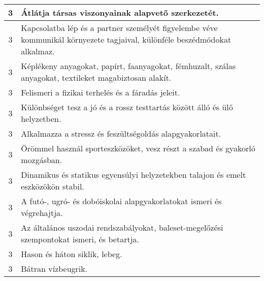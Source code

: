 \begin{longtable}{c | p{12cm} }
                                
                                          3 &  Átlátja társas viszonyainak alapvető szerkezetét. \\ \hline
                                          3 &  Kapcsolatba lép és a partner személyét figyelembe véve kommunikál környezete tagjaival, különféle beszédmódokat alkalmaz. \\ \hline
                                          3 &  Képlékeny anyagokat, papírt, faanyagokat, fémhuzalt, szálas anyagokat, textileket magabiztosan alakít. \\ \hline
                                          3 &  Felismeri a fizikai terhelés és a fáradás jeleit. \\ \hline
                                          3 &  Különbséget tesz a jó és a rossz testtartás között álló és ülő helyzetben. \\ \hline
                                          3 &  Alkalmazza a stressz és feszültségoldás alapgyakorlatait. \\ \hline
                                          3 &  Örömmel használ sporteszközöket, vesz részt a szabad és gyakorló mozgásban. \\ \hline
                                          3 &  Dinamikus és statikus egyensúlyi helyzetekben talajon és emelt eszközökön stabil. \\ \hline
                                          3 &  A futó-, ugró- és dobóiskolai alapgyakorlatokat ismeri és végrehajtja. \\ \hline
                                          3 &  Az általános uszodai rendszabályokat, baleset-megelőzési szempontokat ismeri, és betartja. \\ \hline
                                          3 &  Hason és háton siklik, lebeg. \\ \hline
                                          3 &  Bátran vízbeugrik. \\ \hline
                                      

\end{longtable}
